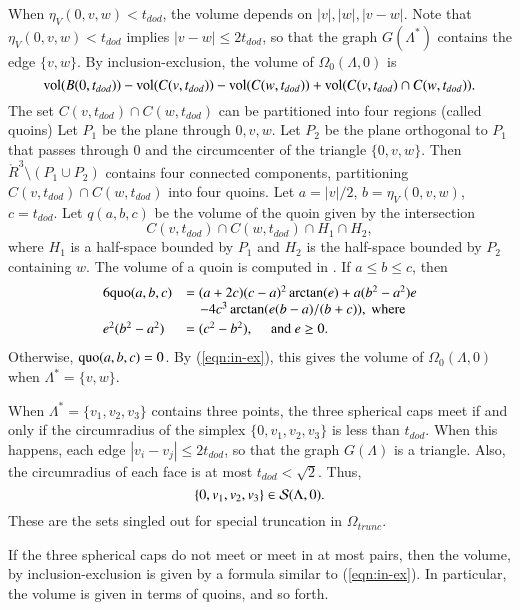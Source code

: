 When $\eta_V(0,v,w) < t_{dod}$, the volume depends on
$|v|,|w|,|v-w|$.  Note that $\eta_V(0,v,w) < t_{dod}$ implies
$|v-w|\le 2t_{dod}$, so that the graph $G(\Lambda^*)$ contains
the edge $\{v,w\}$.
By inclusion-exclusion, the volume of $\Omega_0(\Lambda,0)$ is
   \begin{equation}\label{eqn:in-ex}
   {\operatorname{vol}}(B(0,t_{dod})) - {\operatorname{vol}}(C(v,t_{dod})) - {\operatorname{vol}}(C(w,t_{dod})) +
 {\operatorname{vol}}(C(v,t_{dod}) \cap C(w,t_{dod})).
   \end{equation}
The set $C(v,t_{dod})\cap C(w,t_{dod})$ can be partitioned
into four regions (called quoins)
Let $P_1$ be the plane through $0,v,w$.  Let $P_2$ be the
plane orthogonal to $P_1$ that passes through $0$ and the circumcenter
of the triangle $\{0,v,w\}$.  Then $\ring{R}^3\setminus (P_1\cup P_2)$ 
contains four connected components, partitioning $C(v,t_{dod})\cap C(w,t_{dod})$
into four quoins.  
Let $a=|v|/2$, $b=\eta_V(0,v,w)$, $c=t_{dod}$.  Let $q(a,b,c)$ be the
volume of the quoin given by the intersection
  $$C(v,t_{dod})\cap C(w,t_{dod}) \cap H_1 \cap H_2,
  $$
where $H_1$ is a half-space bounded by $P_1$ and $H_2$ is
the half-space bounded by $P_2$ containing $w$.
The volume of a quoin is computed in \cite[7.3]{DCG}.
If $a\le b\le c$, then 
\begin{equation}
\begin{array}{lll}
6 {\operatorname{quo}}(a,b,c) &= (a+2c) (c-a)^2 \arctan(e) + a(b^2-a^2) e \\
&\quad - 4c^3 \arctan(e(b-a)/(b+c)),\text{ where}\\ [0.5ex]
e^2 (b^2-a^2)&= (c^2 - b^2), \quad \text{ and } e\ge 0.
\end{array}
\end{equation}
Otherwise, ${\operatorname{quo}}(a,b,c) = 0$.  By (\ref{eqn:in-ex}), this gives
the volume of $\Omega_0(\Lambda,0)$ when $\Lambda^*=\{v,w\}$.





When $\Lambda^*=\{v_1,v_2,v_3\}$ contains three points, the three spherical
caps meet if and only if the circumradius of the simplex
$\{0,v_1,v_2,v_3\}$ is less than $t_{dod}$.  When this happens, each
edge $|v_i-v_j|\le 2t_{dod}$, so that the graph $G(\Lambda)$ is a
triangle.  Also, the circumradius of each face is at most
$t_{dod} < \sqrt2$.  Thus, 
  $$\{0,v_1,v_2,v_3\}\in{\mathcal S}(\Lambda,0).$$
These are the sets singled out for special truncation in $\Omega_{trunc}$.

If the three spherical caps do not meet or meet in at most pairs,
then the volume, by inclusion-exclusion is given by a formula
similar to (\ref{eqn:in-ex}).  In particular, the volume
is given in terms of quoins, and so forth.

